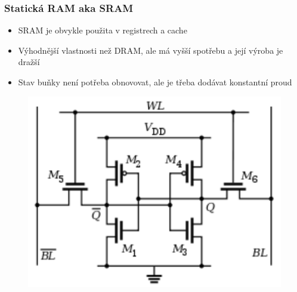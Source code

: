 \documentclass[professionalfonts,svgnames]{beamer}
\begin{document}
\begin{frame}
\frametitle{Statická RAM aka SRAM}
\begin{itemize}
\item SRAM je obvykle použita v registrech a cache
\item Výhodnější vlastnosti než DRAM, ale má vyšší spotřebu a její výroba je dražší
\item Stav buňky není potřeba obnovovat, ale je třeba dodávat konstantní proud
\end{itemize}
\begin{figure}[h]
	\includegraphics[scale=0.6]{fig/sram}
\end{figure}
\end{frame}
\end{document}
